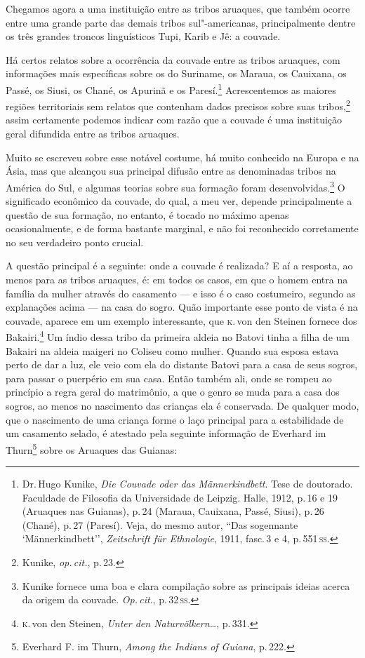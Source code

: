 Chegamos agora a uma instituição entre as tribos aruaques, que também
ocorre entre uma grande parte das demais tribos sul"-americanas,
principalmente dentre os três grandes troncos linguísticos Tupi, Karib
e Jê: a couvade.

Há certos relatos sobre a ocorrência da couvade entre as tribos aruaques,
com informações mais específicas sobre os do Suriname, os
Maraua, os Cauixana, os Passé, os Siusi, os Chané, os Apurinã e os
Paresí.\footnote{Dr.\,Hugo Kunike, \textit{Die Couvade oder das
  Männerkindbett}. Tese de doutorado. Faculdade de Filosofia da
  Universidade de Leipzig. Halle, 1912, p.\,16 e 19 (Aruaques nas
  Guianas), p.\,24 (Maraua, Cauixana, Passé, Siusi), p.\,26 (Chané), p.\,27
  (Paresí). Veja, do mesmo autor, ``Das sogennante `Männerkindbett'',
  \textit{Zeitschrift für Ethnologie}, 1911, fasc.\,3 e 4, p.\,551\,\textsc{ss}.}
Acrescentemos as maiores regiões territoriais sem relatos que contenham
dados precisos sobre suas tribos,\footnote{Kunike, \textit{op.\,cit.}, p.\,23.} assim certamente podemos indicar
com razão que a couvade é uma instituição geral difundida entre as
tribos aruaques.

Muito se escreveu sobre esse notável costume, há muito conhecido
na Europa e na Ásia, mas que alcançou sua principal difusão entre
as denominadas tribos na América do Sul, e algumas teorias sobre sua
formação foram desenvolvidas.\footnote{Kunike fornece uma boa e clara
  compilação sobre as principais ideias acerca da origem da couvade. \textit{Op.\,cit}., p.\,32\,\textsc{ss}.} O significado econômico da couvade, do qual, a
meu ver, depende principalmente a questão de sua formação, no entanto, é tocado no
máximo apenas ocasionalmente, e de forma bastante marginal, e não foi
reconhecido corretamente no seu verdadeiro ponto crucial.

A questão principal é a seguinte: onde a couvade é realizada? E aí a
resposta, ao menos para as tribos aruaques, é: em todos os casos, em que
o homem entra na família da mulher através do casamento --- e isso é o
caso costumeiro, segundo as explanações acima --- na casa do sogro. Quão
importante esse ponto de vista é na couvade, aparece em um exemplo
interessante, que \textsc{k}.\,von den Steinen fornece dos Bakairi.\footnote{\textsc{k}.\,von den Steinen, \textit{Unter den Naturvölkern\ldots}, p.\,331.} Um índio dessa tribo da primeira aldeia no Batovi tinha a filha
de um Bakairi na aldeia maigeri no Coliseu como mulher. Quando sua
esposa estava perto de dar a luz, ele veio com ela do distante Batovi
para a casa de seus sogros, para passar o puerpério em sua casa. Então
também ali, onde se rompeu ao princípio a regra geral do matrimônio, a
que o genro se muda para a casa dos sogros, ao menos no nascimento das
crianças ela é conservada. De qualquer modo, que o nascimento de uma
criança forme o laço principal para a estabilidade de um casamento
selado, é atestado pela seguinte informação de Everhard im
Thurn\footnote{Everhard F. im Thurn, \textit{Among the Indians of Guiana},
  p.\,222.} sobre os Aruaques das Guianas: 

